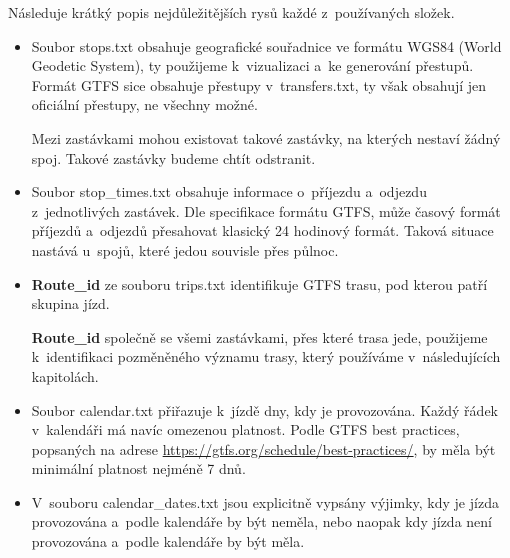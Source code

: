 Následuje krátký popis nejdůležitějších rysů každé z~používaných složek.
\begin{itemize}
    \item Soubor stops.txt obsahuje geografické souřadnice ve formátu WGS84 (World Geodetic System), ty použijeme k~vizualizaci a~ke generování přestupů. Formát GTFS sice obsahuje přestupy v~transfers.txt, ty však obsahují jen oficiální přestupy, ne všechny možné.
    
    Mezi zastávkami mohou existovat takové zastávky, na kterých nestaví žádný spoj. Takové zastávky budeme chtít odstranit.
    
    \item Soubor stop\_times.txt obsahuje informace o~příjezdu a~odjezdu z~jednotlivých zastávek. Dle specifikace formátu GTFS, může časový formát příjezdů a~odjezdů přesahovat klasický 24 hodinový formát. Taková situace nastává u~spojů, které jedou souvisle přes půlnoc.

    \item \textbf{Route\_id} ze souboru trips.txt identifikuje GTFS trasu, pod kterou patří skupina jízd. 
    
    \textbf{Route\_id} společně se všemi zastávkami, přes které trasa jede, použijeme k~identifikaci pozměněného významu trasy, který používáme v~následujících kapitolách.
    
    \item Soubor calendar.txt přiřazuje k~jízdě dny, kdy je provozována. Každý řádek v~kalendáři má navíc omezenou platnost. Podle GTFS best practices, popsaných na adrese \url{https://gtfs.org/schedule/best-practices/}, by měla být minimální platnost nejméně 7 dnů.

    \item V~souboru calendar\_dates.txt jsou explicitně vypsány výjimky, kdy je jízda provozována a~podle kalendáře by být neměla, nebo naopak kdy jízda není provozována a~podle kalendáře by být měla.
\end{itemize}